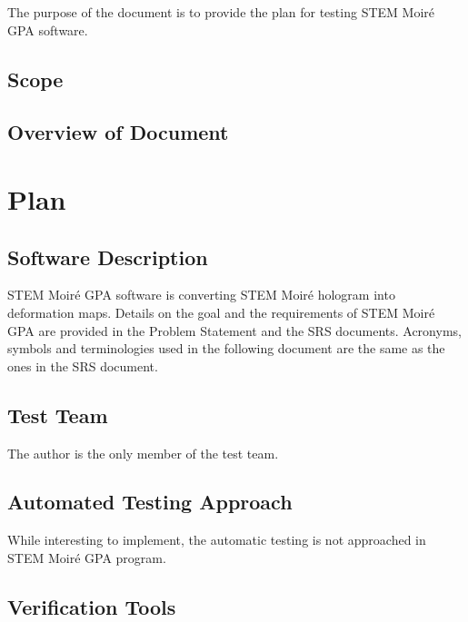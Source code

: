 \documentclass[12pt, titlepage]{article}
\newcommand{\progname}{STEM Moir{\'e} GPA}
\begin{document}
The purpose of the document is to provide the plan for testing \progname{} software. 

\subsection{Scope}

\subsection{Overview of Document}

\section{Plan}
	
\subsection{Software Description}

\progname{} software is converting STEM Moir{\'e} hologram into deformation maps. Details on the goal and the requirements of \progname{} are provided in the Problem Statement and the SRS documents. Acronyms, symbols and terminologies used in the following document are the same as the ones in the SRS document.

\subsection{Test Team}

The author is the only member of the test team.

\subsection{Automated Testing Approach}

While interesting to implement, the automatic testing is not approached in \progname{} program.

\subsection{Verification Tools}


		
\end{document}
